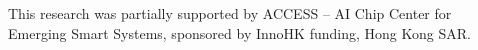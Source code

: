This research was partially supported by ACCESS – AI Chip Center for Emerging Smart Systems, sponsored by InnoHK funding, Hong Kong SAR.